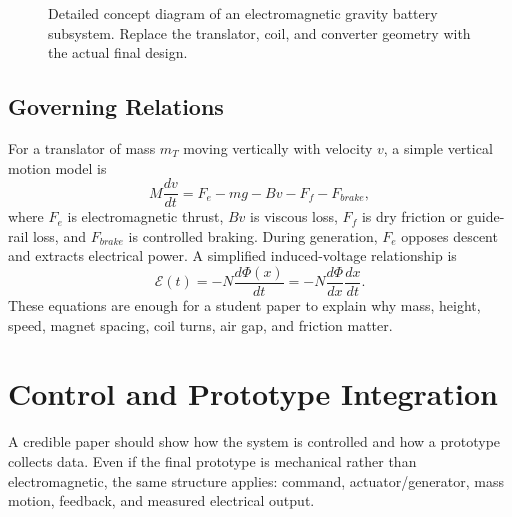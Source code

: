 \documentclass[10.5pt]{article}
\begin{document}
\begin{figure}[H]
{}
\caption{Detailed concept diagram of an electromagnetic gravity battery subsystem. Replace the translator, coil, and converter geometry with the actual final design.}
\label{fig:em}
\end{figure}

\subsection{Governing Relations}
For a translator of mass $m_T$ moving vertically with velocity $v$, a simple vertical motion model is
\begin{equation}
M\frac{dv}{dt}=F_e-mg-Bv-F_f-F_{brake},
\label{eq:dyn}
\end{equation}
where $F_e$ is electromagnetic thrust, $Bv$ is viscous loss, $F_f$ is dry friction or guide-rail loss, and $F_{brake}$ is controlled braking. During generation, $F_e$ opposes descent and extracts electrical power. A simplified induced-voltage relationship is
\begin{equation}
\mathcal{E}(t)=-N\frac{d\Phi(x)}{dt}=-N\frac{d\Phi}{dx}\frac{dx}{dt}.
\label{eq:faraday}
\end{equation}
These equations are enough for a student paper to explain why mass, height, speed, magnet spacing, coil turns, air gap, and friction matter.

\clearpage
\section{Control and Prototype Integration}
A credible paper should show how the system is controlled and how a prototype collects data. Even if the final prototype is mechanical rather than electromagnetic, the same structure applies: command, actuator/generator, mass motion, feedback, and measured electrical output.
\end{document}

